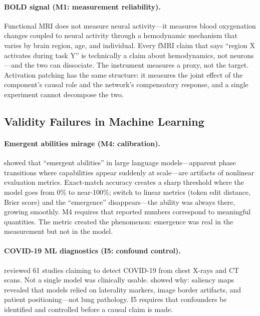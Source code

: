 \documentclass{article}
\begin{document}
\paragraph{BOLD signal (M1: measurement reliability).}
Functional MRI does not measure neural activity---it measures blood oxygenation changes coupled to neural activity through a hemodynamic mechanism that varies by brain region, age, and individual. Every fMRI claim that says ``region X activates during task Y'' is technically a claim about hemodynamics, not neurons---and the two can dissociate. The instrument measures a proxy, not the target. Activation patching has the same structure: it measures the joint effect of the component's causal role and the network's compensatory response, and a single experiment cannot decompose the two.

\subsection{Validity Failures in Machine Learning}

\paragraph{Emergent abilities mirage (M4: calibration).}
\citet{schaeffer2024emergent} showed that ``emergent abilities'' in large language models---apparent phase transitions where capabilities appear suddenly at scale---are artifacts of nonlinear evaluation metrics. Exact-match accuracy creates a sharp threshold where the model goes from 0\% to near-100\%; switch to linear metrics (token edit distance, Brier score) and the ``emergence'' disappears---the ability was always there, growing smoothly. M4 requires that reported numbers correspond to meaningful quantities. The metric created the phenomenon: emergence was real in the measurement but not in the model.

\paragraph{COVID-19 ML diagnostics (I5: confound control).}
\citet{roberts2021common} reviewed 61 studies claiming to detect COVID-19 from chest X-rays and CT scans. Not a single model was clinically usable. \citet{degrave2021ai} showed why: saliency maps revealed that models relied on laterality markers, image border artifacts, and patient positioning---not lung pathology. I5 requires that confounders be identified and controlled before a causal claim is made.
\end{document}
